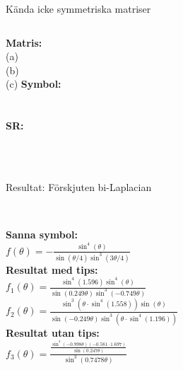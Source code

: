 \documentclass{beamer}
\begin{document}
\begin{frame}{Kända icke symmetriska matriser}
    \begin{columns}
        \textbf{Matris:}\\
        (a)\\
        (b)\\
        (c)
        \textbf{Symbol:}\\
        \\
        \\
        \textbf{SR:}\\
        \\
        \\
    \end{columns}
    \quad\quad\quad\quad\quad\quad\quad\quad\quad\quad\quad\quad\quad\quad\quad\quad\quad\quad\quad\quad\quad\quad\quad
\end{frame}

\begin{frame}{Resultat: Förskjuten bi-Laplacian}
    \begin{columns}
        \\
        \textbf{Sanna symbol:}\\
        $f(\theta) = -\frac{\sin^4(\theta)}{\sin(\theta/4)\sin^3(3\theta/4)}$\\
        \textbf{Resultat med tips:}\\
        $ f_1(\theta) = \frac{\sin^4(1.596)\sin^4(\theta)}{\sin(0.249 \theta)\sin^3(-0.749\theta)}$\\
        $f_2(\theta) = \frac{\sin^3(\theta \cdot \sin^4(1.558))\sin(\theta)}{\sin( -0.249\theta)\sin^3(\theta \cdot \sin^4(1.196))}$\\
        \textbf{Resultat utan tips:}\\
        $f_3(\theta) = \frac{\frac{\sin^4(-0.998\theta) (-0.581 \cdot 1.697)}{\sin(0.247\theta)}}{\sin^3(0.7478\theta)}$\\
    \end{columns}
\end{frame}
\end{document}

